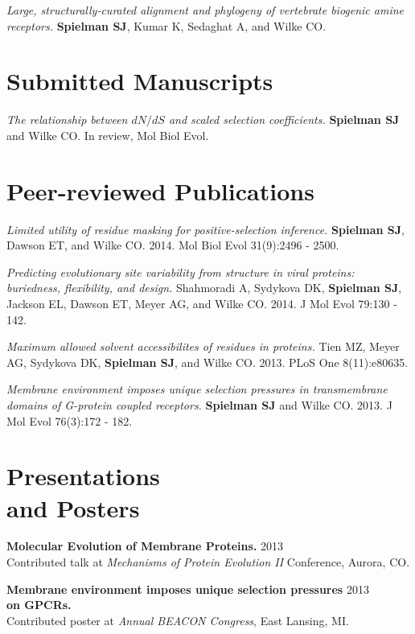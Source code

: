 \documentclass[line, margin]{res}
\begin{document}
\begin{resume}
\emph{Large, structurally-curated alignment and phylogeny of vertebrate biogenic amine receptors.} \textbf{Spielman SJ}, Kumar K, Sedaghat A, and Wilke CO.

\vspace{0.75cm}

\section{Submitted Manuscripts}

\emph{The relationship between $dN/dS$ and scaled selection coefficients.} \textbf{Spielman SJ} and Wilke CO. In review, Mol Biol Evol.


\vspace{0.75cm}

\section{Peer-reviewed Publications}

\emph{Limited utility of residue masking for positive-selection inference.} \textbf{Spielman SJ}, Dawson ET, and Wilke CO. 2014. Mol Biol Evol 31(9):2496 - 2500.

\emph{Predicting evolutionary site variability from structure in viral proteins: buriedness, flexibility, and design.} Shahmoradi A, Sydykova DK, \textbf{Spielman SJ}, Jackson EL, Dawson ET, Meyer AG, and Wilke CO. 2014. J Mol Evol 79:130 - 142.

\emph{Maximum allowed solvent accessibilites of residues in proteins.} Tien MZ, Meyer AG, Sydykova DK, \textbf{Spielman SJ}, and Wilke CO. 2013. PLoS One 8(11):e80635.

\emph{Membrane environment imposes unique selection pressures in transmembrane domains of G-protein coupled receptors.} \textbf{Spielman SJ} and Wilke CO. 2013. J Mol Evol 76(3):172 - 182.

\vspace{0.75cm}


\section{Presentations \\ and Posters}

\textbf{Molecular Evolution of Membrane Proteins.} \hfill 2013 \\ Contributed talk at \emph{Mechanisms of Protein Evolution II} Conference, Aurora, CO.

\textbf{Membrane environment imposes unique selection pressures} \hfill 2013 \\ \textbf{on GPCRs.} \\ Contributed poster at \emph{Annual BEACON Congress}, East Lansing, MI.


\end{resume}
\end{document}
